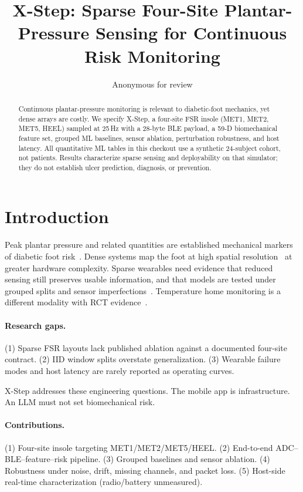 \documentclass[runningheads]{llncs}
\begin{document}
\title{X-Step: Sparse Four-Site Plantar-Pressure Sensing for Continuous Risk Monitoring}
\author{Anonymous for review}
\maketitle
\begin{abstract}
Continuous plantar-pressure monitoring is relevant to diabetic-foot mechanics, yet dense arrays are costly. We specify X-Step, a four-site FSR insole (MET1, MET2, MET5, HEEL) sampled at 25\,Hz with a 28-byte BLE payload, a 59-D biomechanical feature set, grouped ML baselines, sensor ablation, perturbation robustness, and host latency. All quantitative ML tables in this checkout use a synthetic 24-subject cohort, not patients. Results characterize sparse sensing and deployability on that simulator; they do not establish ulcer prediction, diagnosis, or prevention.
\end{abstract}

\section{Introduction}
Peak plantar pressure and related quantities are established mechanical markers of diabetic foot risk~\cite{armstrong2017,bus2016,fernando2014}. Dense systems map the foot at high spatial resolution~\cite{razak2012} at greater hardware complexity. Sparse wearables need evidence that reduced sensing still preserves usable information, and that models are tested under grouped splits and sensor imperfections~\cite{hegde2016}. Temperature home monitoring is a different modality with RCT evidence~\cite{armstrong2007,lavery2007,frykberg2017}.

\paragraph{Research gaps.}
(1) Sparse FSR layouts lack published ablation against a documented four-site contract.
(2) IID window splits overstate generalization.
(3) Wearable failure modes and host latency are rarely reported as operating curves.

X-Step addresses these engineering questions. The mobile app is infrastructure. An LLM must not set biomechanical risk.

\paragraph{Contributions.}
(1) Four-site insole targeting MET1/MET2/MET5/HEEL.
(2) End-to-end ADC--BLE--feature--risk pipeline.
(3) Grouped baselines and sensor ablation.
(4) Robustness under noise, drift, missing channels, and packet loss.
(5) Host-side real-time characterization (radio/battery unmeasured).
\end{document}
